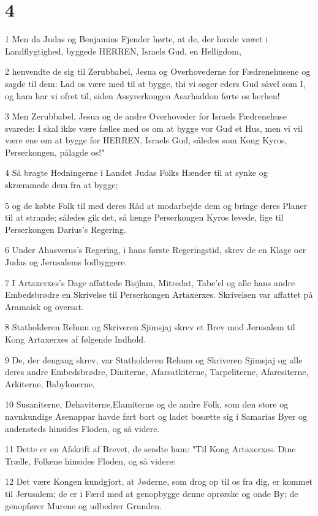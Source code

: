 \chapter{4}

\par 1 Men da Judas og Benjamins Fjender hørte, at de, der havde været i Landflygtighed, byggede HERREN, Israels Gud, en Helligdom,
\par 2 henvendte de sig til Zerubbabel, Jesua og Overhovederne for Fædrenehusene og sagde til dem: Lad os være med til at bygge, thi vi søger eders Gud såvel som I, og ham har vi ofret til, siden Assyrerkongen Asarhaddon førte os herhen!
\par 3 Men Zerubbabel, Jesua og de andre Overhoveder for Israels Fædrenehuse svarede: I skal ikke være fælles med os om at bygge vor Gud et Hus, men vi vil være ene om at bygge for HERREN, Israels Gud, således som Kong Kyros, Perserkongen, pålagde os!"
\par 4 Så bragte Hedningerne i Landet Judas Folks Hænder til at synke og skræmmede dem fra at bygge;
\par 5 og de købte Folk til med deres Råd at modarbejde dem og bringe deres Planer til at strande; således gik det, så længe Perserkongen Kyros levede, lige til Perserkongen Darius's Regering.
\par 6 Under Ahasverus's Regering, i hans første Regeringstid, skrev de en Klage oer Judas og Jerusalems lodbyggere.
\par 7 I Artaxerxes's Dage affattede Bisjlam, Mitredat, Tabe'el og alle hans andre Embedsbrødre en Skrivelse til Perserkongen Artaxerxes. Skrivelsen var affattet på Aramaisk og oversat.
\par 8 Statholderen Rehum og Skriveren Sjimsjaj skrev et Brev mod Jerusalem til Kong Artaxerxes af følgende Indhold.
\par 9 De, der dengang skrev, var Statholderen Rehum og Skriveren Sjimsjaj og alle deres andre Embedsbrødre, Diniterne, Afarsatkiterne, Tarpeliterne, Afaresiterne, Arkiterne, Babylonerne,
\par 10 Susaniterne, Dehaviterne,Elamiterne og de andre Folk, som den store og navnkundige Asenappar havde ført bort og ladet bosætte sig i Samarias Byer og andensteds hinsides Floden, og så videre.
\par 11 Dette er en Afskrift af Brevet, de sendte ham: "Til Kong Artaxerxes. Dine Trælle, Folkene hinsides Floden, og så videre:
\par 12 Det være Kongen kundgjort, at Jøderne, som drog op til os fra dig, er kommet til Jerusalem; de er i Færd med at genopbygge denne oprørske og onde By; de genopfører Murene og udbedrer Grunden.
